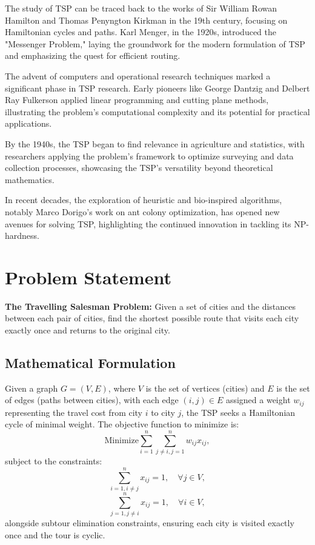The study of TSP can be traced back to the works of Sir William Rowan Hamilton and Thomas Penyngton Kirkman in the 19th century, focusing on Hamiltonian cycles and paths. Karl Menger, in the 1920s, introduced the "Messenger Problem," laying the groundwork for the modern formulation of TSP and emphasizing the quest for efficient routing.

The advent of computers and operational research techniques marked a significant phase in TSP research. Early pioneers like George Dantzig and Delbert Ray Fulkerson applied linear programming and cutting plane methods, illustrating the problem's computational complexity and its potential for practical applications.

By the 1940s, the TSP began to find relevance in agriculture and statistics, with researchers applying the problem's framework to optimize surveying and data collection processes, showcasing the TSP's versatility beyond theoretical mathematics.

In recent decades, the exploration of heuristic and bio-inspired algorithms, notably Marco Dorigo's work on ant colony optimization, has opened new avenues for solving TSP, highlighting the continued innovation in tackling its NP-hardness.

\section{Problem Statement}

\textbf{The Travelling Salesman Problem:} Given a set of cities and the distances between each pair of cities, find the shortest possible route that visits each city exactly once and returns to the original city.

\subsection{Mathematical Formulation}

Given a graph \(G = (V, E)\), where \(V\) is the set of vertices (cities) and \(E\) is the set of edges (paths between cities), with each edge \((i, j) \in E\) assigned a weight \(w_{ij}\) representing the travel cost from city \(i\) to city \(j\), the TSP seeks a Hamiltonian cycle of minimal weight.
The objective function to minimize is:
\[
	\text{Minimize} \sum_{i=1}^{n} \sum_{j \ne i, j=1}^{n} w_{ij} x_{ij},
\]
subject to the constraints:
\[
	\sum_{i=1, i \ne j}^{n} x_{ij} = 1, \quad \forall j \in V,
\]
\[
	\sum_{j=1, j \ne i}^{n} x_{ij} = 1, \quad \forall i \in V,
\]
alongside subtour elimination constraints, ensuring each city is visited exactly once and the tour is cyclic.

